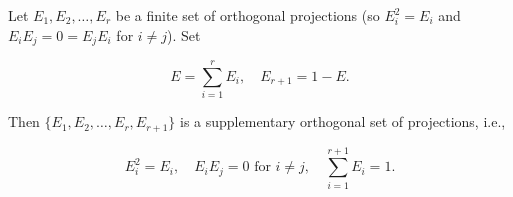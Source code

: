 Let $E_1, E_2, \ldots, E_r$ be a finite set of orthogonal projections (so $E_i^2 = E_i$ and $E_i E_j = 0 = E_j E_i$ for $i \neq j$). Set

$$E = \sum_{i=1}^r E_i, \quad E_{r+1} = 1 - E.$$

Then $\{E_1, E_2, \ldots, E_r, E_{r+1}\}$ is a supplementary orthogonal set of projections, i.e.,

$$E_i^2 = E_i, \quad E_i E_j = 0 \text{ for } i \neq j, \quad \sum_{i=1}^{r+1} E_i = 1.$$
